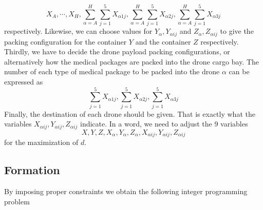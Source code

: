 \documentclass{mcmthesis}
\begin{document}
\begin{equation*}
	X_A,\cdots,X_H,\sum_{\alpha=A}^H\sum_{j=1}^{5}X_{\alpha 1j},\sum_{\alpha=A}^H\sum_{j=1}^{5}X_{\alpha 2j},\sum_{\alpha=A}^H\sum_{j=1}^{5}X_{\alpha 3j}
\end{equation*} 
respectively. Likewise, we can choose values for $Y_\alpha,Y_{\alpha ij}$ and $Z_{\alpha},Z_{\alpha ij}$ to give the packing configuration for the container $Y$ and the container $Z$ respectively. Thirdly, we have to decide the drone payload packing configurations, or alternatively how the medical packages are packed into the drone cargo bay. The number of each type of medical package to be packed into the drone $\alpha$ can be expressed as
\begin{equation*}
\sum_{j=1}^{5}X_{\alpha 1j},\sum_{j=1}^{5}X_{\alpha 2j},\sum_{j=1}^{5}X_{\alpha 3j}
\end{equation*} Finally, the destination of each drone should be given. That is exactly what the variables $X_{\alpha ij},Y_{\alpha ij},Z_{\alpha ij}$ indicate. In a word, we need to adjust the 9 variables
\[
X,Y,Z,X_{\alpha},Y_{\alpha},Z_{\alpha},X_{\alpha ij},Y_{\alpha ij},Z_{\alpha ij}
\]
for the maximization of $d$.

\subsection{Formation}

\noindent By imposing proper constraints we obtain the following integer programming problem
\end{document}
